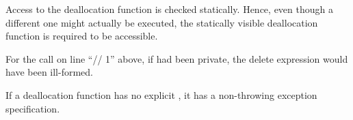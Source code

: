 \pnum
Access to the deallocation function is checked statically.
Hence, even though a different one might actually be executed,
the statically visible deallocation function is required to be accessible.
\begin{example}
For the call on line ``// 1'' above,
if
had been private, the delete expression would have been ill-formed.
\end{example}

\pnum
\begin{note}
If a deallocation function has no explicit , it
has a non-throwing exception specification.
\end{note}
